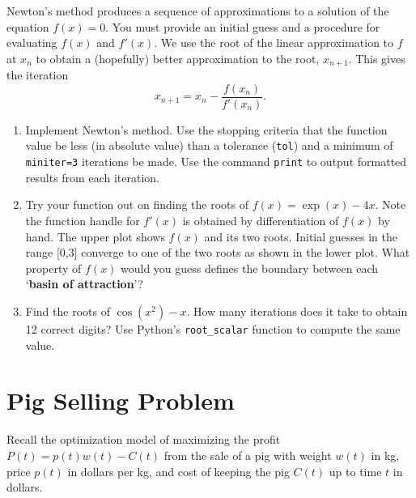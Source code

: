 \documentclass[letter]{article}
\begin{document}
Newton's method produces a sequence of approximations to a solution of the equation $f(x)=0$. You must provide an initial guess and a procedure for evaluating $f(x)$ and $f'(x)$. We use the root of the linear approximation to $f$ at $x_n$ to obtain a (hopefully) better approximation to the root, $x_{n+1}$. This gives the iteration 
$$x_{n+1} = x_n - \frac{f(x_n)}{f'(x_n)}.$$

\begin{enumerate}[resume]

\item Implement Newton's method. Use the stopping criteria that the function value be less (in absolute value) than a tolerance (\verb|tol|) and a minimum of \verb|miniter=3| iterations be made. Use the command \verb|print| to output formatted results from each iteration.

\item Try your function out on finding the roots of $f(x) = \exp(x) - 4x$. Note the function handle for $f'(x)$ is obtained by differentiation of $f(x)$ by hand. The upper plot shows $f(x)$ and its two roots. Initial guesses in the range [0,3] converge to one of the two roots as shown in the lower plot. What property of $f(x)$ would you guess defines the boundary between each `\textbf{basin of attraction}'?

\item Find the roots of $\cos(x^2) - x$. How many iterations does it take to obtain 12 correct digits? Use Python's \verb|root_scalar| function to compute the same value.

\end{enumerate}

\newpage


\section{Pig Selling Problem}

Recall the optimization model of maximizing the profit $P(t) = p(t)w(t) - C(t)$ from the sale of a pig with weight $w(t)$ in kg, price $p(t)$ in dollars per kg, and cost of keeping the pig $C(t)$ up to time $t$ in dollars.
\end{document}
